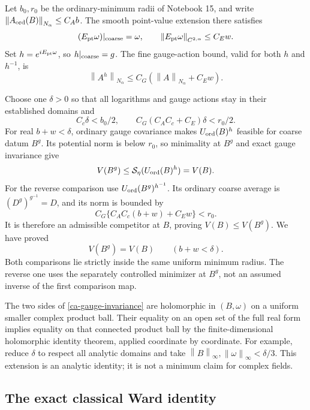 \documentclass[11pt]{article}
\theoremstyle{remark}
\newcommand{\norm}[1]{\left\|#1\right\|}
\begin{document}
Let $b_0,r_0$ be the ordinary-minimum radii of Notebook 15,
and write
$\norm{A_{\rm ord}(B)}_{N_\alpha}\le C_Ab$.
The smooth point-value extension there satisfies
\begin{equation}\label{ca-smooth-gauge-lift}
 (E_{\rm pt}\omega)|_{\rm coarse}=\omega,\qquad
 \norm{E_{\rm pt}\omega}_{C^{2,\alpha}}\le C_Ew.
\end{equation}
Set $h=e^{iE_{\rm pt}\omega}$, so $h|_{\rm coarse}=g$.
The fine gauge-action bound, valid for both $h$ and $h^{-1}$,
is
\begin{equation}\label{ca-fine-gauge-bound}
 \norm{A^h}_{N_\alpha}
       \le C_G(\norm A_{N_\alpha}+C_Ew).
\end{equation}

Choose one $\delta>0$ so that all logarithms and gauge actions
stay in their established domains and
\begin{equation}\label{ca-comparison-margins}
 C_c\delta<b_0/2,\qquad
 C_G(C_AC_c+C_E)\delta<r_0/2.
\end{equation}
For real $b+w<\delta$, ordinary gauge covariance makes
$U_{\rm ord}(B)^h$ feasible for coarse datum $B^g$.
Its potential norm is below $r_0$, so minimality at $B^g$
and exact gauge invariance give
\[
 V(B^g)\le\mathcal S_\eta(U_{\rm ord}(B)^h)=V(B).
\]
For the reverse comparison use
$U_{\rm ord}(B^g)^{h^{-1}}$. Its ordinary coarse average is
$(D^g)^{g^{-1}}=D$, and its norm is bounded by
\[
 C_G\{C_AC_c(b+w)+C_Ew\}<r_0.
\]
It is therefore an admissible competitor at $B$, proving
$V(B)\le V(B^g)$. We have proved
\begin{equation}\label{ca-gauge-invariance}
 \boxed{\qquad V(B^g)=V(B)\qquad(b+w<\delta).\qquad}
\end{equation}
Both comparisons lie strictly inside the same uniform minimum
radius. The reverse one uses the separately controlled minimizer
at $B^g$, not an assumed inverse of the first comparison map.

The two sides of \eqref{ca-gauge-invariance} are holomorphic
in $(B,\omega)$ on a uniform smaller complex product ball.
Their equality on an open set of the full real form implies
equality on that connected product ball by the finite-dimensional
holomorphic identity theorem, applied coordinate by coordinate.
For example, reduce $\delta$ to respect all analytic domains
and take $\norm B_\infty,\norm\omega_\infty<\delta/3$.
This extension is an analytic identity; it is not a minimum
claim for complex fields.

\subsection{The exact classical Ward identity}
\label{ca-ward-section}
\end{document}
